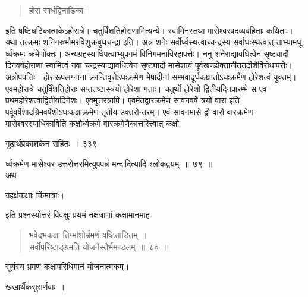 \documentclass[11pt, openany]{book}
\begin{document}
 \begin{quote}
 {\qt  होरा सार्धद्विनाडिका। }
\end{quote}
इति षष्टिघटिकात्मकेऽहोरात्रे। चतुर्विंशतिहोराणामित्यन्ये। स्वामिनस्तथा मासेश्वरवदव्यवहिताः कथिताः। यथा तत्क्रमः शनिगरुभौमरविशुक्रबुधचन्द्रा इति। अत्र शनेः सर्वोर्ध्वस्थत्वाच्चन्द्रस्य सर्वाधःस्थत्वात् ताभ्यामधू र्ध्वक्रमः क्रमेणोक्तः। अन्यग्रहस्याधिपत्वाभ्युपगमं विनिगमनाविरहापत्तेः। ननु शनेराद्यावधित्वेन सृष्ट्यादौ दिनवर्षहोराणां स्वामित्वं नवा चन्द्रस्याद्यावधित्वेन सृष्ट्यादौ मासेशत्वं पूर्वखण्डोक्तानीततदीशैर्विरोधापत्तेः। अत्रोपपत्तिः। होरारूपलग्नानां क्रान्तिवृत्तेऽधःक्रमेण मेषादीनां सम्भवादूर्धकक्षातौऽधःक्रमैण होरेशत्वं युक्तम्। एवमहोरात्रे चतुर्विंशतिहोराः सप्ततष्टास्त्रयो होरेशा गताः। चतुर्थो होरेशो द्वितीयदिनप्रारम्भे स एव प्रथमहोरेशत्वाद्वितीयदिनेशः। एवमुत्तरत्रापि। एवमेतद्वारक्रमेण सावनवर्षे त्रयो वारा इति पर्वूवर्षेशादग्रिमवर्षेशोऽधःकक्षाक्रमेण तृतीय उक्तरोन्तरम्। एवं सावनमासे द्वौ वारौ वारक्रमेण मासेश्वरस्याधिकाविति कक्षोर्ध्वक्रमे वारक्रमेणैकात्तरित्त्वात् कक्षो \textendash
%


\newpage


 \hspace{3cm} गूढार्थप्रकाशकेन सहितः~। \hfill ३३९
\vspace{1cm}



\noindent र्ध्वक्रमेण मासेश्वर उत्तरोत्तरमित्युपपन्नं मन्दादित्यादि श्लोकद्वयम्~॥~७९~॥ \\
अथ \textendash

\begin{center}
{\qt ग्रहर्क्षकक्षाः किंमात्राः। }
\end{center}

इति प्रश्नस्योत्तरं विवक्षुः प्रथमं नक्षत्राणां कक्षामानमाह\textendash


\begin{quote}
 {\ssi भवेद्भकक्षा तिग्मांशोर्भ्रमणं षष्टिताडितम्~।\\
सर्वोपरिष्टाङ्ग्रमति योजनैस्तैर्भमण्डलम्~॥~८०~॥}
\end{quote}

 सूर्यस्य भ्रमणं कक्षापरिधिमानं योजनात्मकम्। 

\begin{center}
{\qt खखार्थैकसुरार्णवाः~।} 
\end{center}
\end{document}
